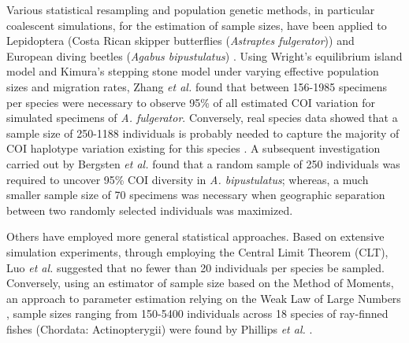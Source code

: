 Various statistical resampling and population genetic methods, in particular coalescent simulations, for the estimation of sample sizes, have been applied to Lepidoptera (Costa Rican skipper butterflies (\textit{Astraptes fulgerator})) \cite{zhang2010estimating} and European diving beetles (\textit{Agabus bipustulatus}) \cite{bergsten2012effect}. Using Wright's equilibrium island model \cite{wright1951genetical} and Kimura's stepping stone model \cite{kimura1964stepping} under varying effective population sizes and migration rates, Zhang \textit{et al.} \cite{zhang2010estimating} found that between 156-1985 specimens per species were necessary to observe 95\% of all estimated COI variation for simulated specimens of \textit{A. fulgerator}. Conversely, real species data showed that a sample size of 250-1188 individuals is probably needed to capture the majority of COI haplotype variation existing for this species \cite{zhang2010estimating}. A subsequent investigation carried out by Bergsten \textit{et al.}\cite{bergsten2012effect} found that a random sample of 250 individuals was required to uncover 95\% COI diversity in \textit{A. bipustulatus}; whereas, a much smaller sample size of 70 specimens was necessary when geographic separation between two randomly selected individuals was maximized. 

Others have employed more general statistical approaches. Based on extensive \\ simulation experiments, through employing the Central Limit Theorem (CLT), Luo \textit{et al.} \cite{luo2015simulation} suggested that no fewer than 20 individuals per species be sampled. Conversely, using an estimator of sample size based on the Method of Moments, an approach to parameter estimation relying on the Weak Law of Large Numbers \cite{pearson1894contributions}, sample sizes ranging from 150-5400 individuals across 18 species of ray-finned fishes (Chordata: Actinopterygii) were found by Phillips \textit{et al.} \cite{phillips2015exploration}. 

